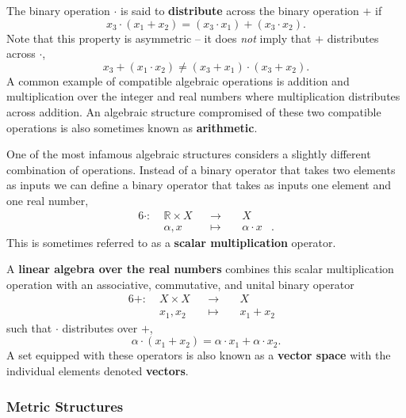 \documentclass[
  letterpaper,
  DIV=11,
  numbers=noendperiod]{scrartcl}
\begin{document}
The binary operation \(\cdot\) is said to \textbf{distribute} across the
binary operation \(+\) if \[
x_3 \cdot (x_1 + x_2) = (x_3 \cdot x_1) + (x_3 \cdot x_2).
\] Note that this property is asymmetric -- it does \emph{not} imply
that \(+\) distributes across \(\cdot\), \[
x_3 + (x_1 \cdot x_2) \ne (x_3 + x_1) \cdot (x_3 + x_2).
\] A common example of compatible algebraic operations is addition and
multiplication over the integer and real numbers where multiplication
distributes across addition. An algebraic structure compromised of these
two compatible operations is also sometimes known as
\textbf{arithmetic}.

One of the most infamous algebraic structures considers a slightly
different combination of operations. Instead of a binary operator that
takes two elements as inputs we can define a binary operator that takes
as inputs one element and one real number, \begin{alignat*}{6}
\cdot :\; & \mathbb{R} \times X& &\rightarrow& \; & X &
\\
& \alpha, x & &\mapsto& & \alpha \cdot x &.
\end{alignat*} This is sometimes referred to as a \textbf{scalar
multiplication} operator.

A \textbf{linear algebra over the real numbers} combines this scalar
multiplication operation with an associative, commutative, and unital
binary operator \begin{alignat*}{6}
+ :\; & X \times X& &\rightarrow& \; & X &
\\
& x_{1}, x_{2} & &\mapsto& & x_{1} + x_{2} &
\end{alignat*} such that \(\cdot\) distributes over \(+\), \[
\alpha \cdot (x_{1} + x_{2}) = \alpha \cdot x_{1} + \alpha \cdot x_{2}.
\] A set equipped with these operators is also known as a \textbf{vector
space} with the individual elements denoted \textbf{vectors}.

\hypertarget{metric-structures}{%
\subsubsection{Metric Structures}\label{metric-structures}}
\end{document}
